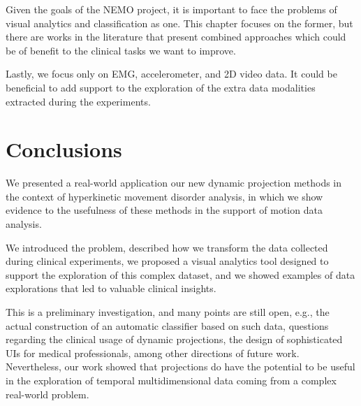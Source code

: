 Given the goals of the NEMO project, it is important to face the problems of visual analytics and classification as one. This chapter focuses on the former, but there are works in the literature that present combined approaches \citep{Graving2020.07.17.207993,rauber_aid} which could be of benefit to the clinical tasks we want to improve. 

Lastly, we focus only on EMG, accelerometer, and 2D video data. It could be beneficial to add support to the exploration of the extra data modalities extracted during the experiments.


\section{Conclusions}

We presented a real-world application our new dynamic projection methods in the context of hyperkinetic movement disorder analysis, in which we show evidence to the usefulness of these methods in the support of motion data analysis.

We introduced the problem, described how we transform the data collected during clinical experiments, we proposed a visual analytics tool designed to support the exploration of this complex dataset, and we showed examples of data explorations that led to valuable clinical insights.

This is a preliminary investigation, and many points are still open, e.g., the actual construction of an automatic classifier based on such data, questions regarding the clinical usage of dynamic projections, the design of sophisticated UIs for medical professionals, among other directions of future work. Nevertheless, our work showed that projections do have the potential to be useful in the exploration of temporal multidimensional data coming from a complex real-world problem.